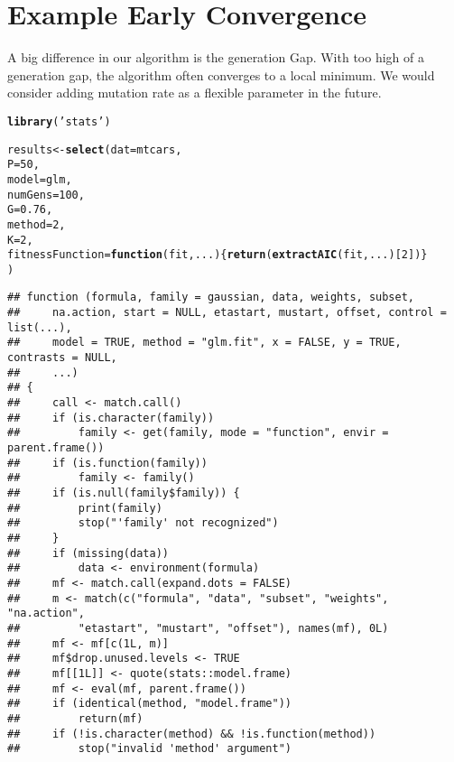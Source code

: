 \documentclass{article}\usepackage[]{graphicx}\usepackage[]{color}
\makeatletter
\newcommand{\hlnum}[1]{\textcolor[rgb]{0.686,0.059,0.569}{#1}}%
\newcommand{\hlstr}[1]{\textcolor[rgb]{0.192,0.494,0.8}{#1}}%
\newcommand{\hlstd}[1]{\textcolor[rgb]{0.345,0.345,0.345}{#1}}%
\newcommand{\hlkwa}[1]{\textcolor[rgb]{0.161,0.373,0.58}{\textbf{#1}}}%
\newcommand{\hlkwb}[1]{\textcolor[rgb]{0.69,0.353,0.396}{#1}}%
\newcommand{\hlkwc}[1]{\textcolor[rgb]{0.333,0.667,0.333}{#1}}%
\newcommand{\hlkwd}[1]{\textcolor[rgb]{0.737,0.353,0.396}{\textbf{#1}}}%
\newenvironment{kframe}{%
 \def\at@end@of@kframe{}%
 \ifinner\ifhmode%
  \def\at@end@of@kframe{\end{minipage}}%
  \begin{minipage}{\columnwidth}%
 \fi\fi%
 \def\FrameCommand##1{\hskip\@totalleftmargin \hskip-\fboxsep
 \colorbox{shadecolor}{##1}\hskip-\fboxsep
     \hskip-\linewidth \hskip-\@totalleftmargin \hskip\columnwidth}%
 \MakeFramed {\advance\hsize-\width
   \@totalleftmargin\z@ \linewidth\hsize
   \@setminipage}}%
 {\par\unskip\endMakeFramed%
 \at@end@of@kframe}
\newenvironment{knitrout}{}{} %
\makeatother
\begin{document}
\section*{Example Early Convergence}

A big difference in our algorithm is the generation Gap. With too high of a generation gap, the algorithm often converges to a local minimum. We would consider adding mutation rate as a flexible parameter in the future.
\begin{knitrout}
\color{fgcolor}\begin{kframe}
\begin{alltt}
\hlkwd{library}\hlstd{(}\hlstr{'stats'}\hlstd{)}

\hlstd{results}\hlkwb{<-}\hlkwd{select}\hlstd{(}\hlkwc{dat}\hlstd{=mtcars,}
                \hlkwc{P}\hlstd{=}\hlnum{50}\hlstd{,}
                \hlkwc{model}\hlstd{=glm,}
                \hlkwc{numGens}\hlstd{=}\hlnum{100}\hlstd{,}
                \hlkwc{G}\hlstd{=}\hlnum{0.76}\hlstd{,}
                \hlkwc{method}\hlstd{=}\hlnum{2}\hlstd{,}
                \hlkwc{K}\hlstd{=}\hlnum{2}\hlstd{,}
                \hlkwc{fitnessFunction}\hlstd{=}\hlkwa{function}\hlstd{(}\hlkwc{fit}\hlstd{,}\hlkwc{...}\hlstd{)\{}\hlkwd{return}\hlstd{(}\hlkwd{extractAIC}\hlstd{(fit,...)[}\hlnum{2}\hlstd{])\}}
                \hlstd{)}
\end{alltt}
\begin{verbatim}
## function (formula, family = gaussian, data, weights, subset, 
##     na.action, start = NULL, etastart, mustart, offset, control = list(...), 
##     model = TRUE, method = "glm.fit", x = FALSE, y = TRUE, contrasts = NULL, 
##     ...) 
## {
##     call <- match.call()
##     if (is.character(family)) 
##         family <- get(family, mode = "function", envir = parent.frame())
##     if (is.function(family)) 
##         family <- family()
##     if (is.null(family$family)) {
##         print(family)
##         stop("'family' not recognized")
##     }
##     if (missing(data)) 
##         data <- environment(formula)
##     mf <- match.call(expand.dots = FALSE)
##     m <- match(c("formula", "data", "subset", "weights", "na.action", 
##         "etastart", "mustart", "offset"), names(mf), 0L)
##     mf <- mf[c(1L, m)]
##     mf$drop.unused.levels <- TRUE
##     mf[[1L]] <- quote(stats::model.frame)
##     mf <- eval(mf, parent.frame())
##     if (identical(method, "model.frame")) 
##         return(mf)
##     if (!is.character(method) && !is.function(method)) 
##         stop("invalid 'method' argument")

\end{verbatim}
\end{kframe}
\end{knitrout}
\end{document}
